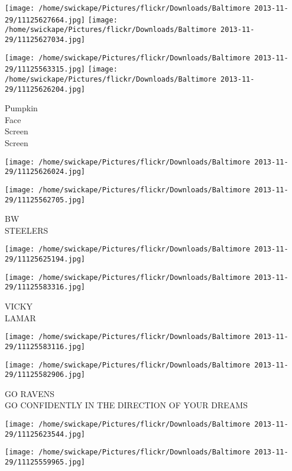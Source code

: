 \documentclass[10pt,letterpaper]{article}
\begin{document}
\texttt{[image: /home/swickape/Pictures/flickr/Downloads/Baltimore 2013-11-29/11125627664.jpg]}
\texttt{[image: /home/swickape/Pictures/flickr/Downloads/Baltimore 2013-11-29/11125627034.jpg]}

\texttt{[image: /home/swickape/Pictures/flickr/Downloads/Baltimore 2013-11-29/11125563315.jpg]}
\texttt{[image: /home/swickape/Pictures/flickr/Downloads/Baltimore 2013-11-29/11125626204.jpg]}

Pumpkin\\
Face\\
Screen\\
Screen\\
\pagebreak

\texttt{[image: /home/swickape/Pictures/flickr/Downloads/Baltimore 2013-11-29/11125626024.jpg]}

\vspace{0.25in}
\texttt{[image: /home/swickape/Pictures/flickr/Downloads/Baltimore 2013-11-29/11125562705.jpg]}

BW\\
STEELERS\\
\pagebreak

\texttt{[image: /home/swickape/Pictures/flickr/Downloads/Baltimore 2013-11-29/11125625194.jpg]}

\vspace{0.25in}
\texttt{[image: /home/swickape/Pictures/flickr/Downloads/Baltimore 2013-11-29/11125583316.jpg]}

VICKY\\
LAMAR\\
\pagebreak

\texttt{[image: /home/swickape/Pictures/flickr/Downloads/Baltimore 2013-11-29/11125583116.jpg]}

\vspace{0.25in}
\texttt{[image: /home/swickape/Pictures/flickr/Downloads/Baltimore 2013-11-29/11125582906.jpg]}

GO RAVENS\\
GO CONFIDENTLY IN THE DIRECTION OF YOUR DREAMS\\
\pagebreak

\texttt{[image: /home/swickape/Pictures/flickr/Downloads/Baltimore 2013-11-29/11125623544.jpg]}

\vspace{0.25in}
\texttt{[image: /home/swickape/Pictures/flickr/Downloads/Baltimore 2013-11-29/11125559965.jpg]}
\end{document}
